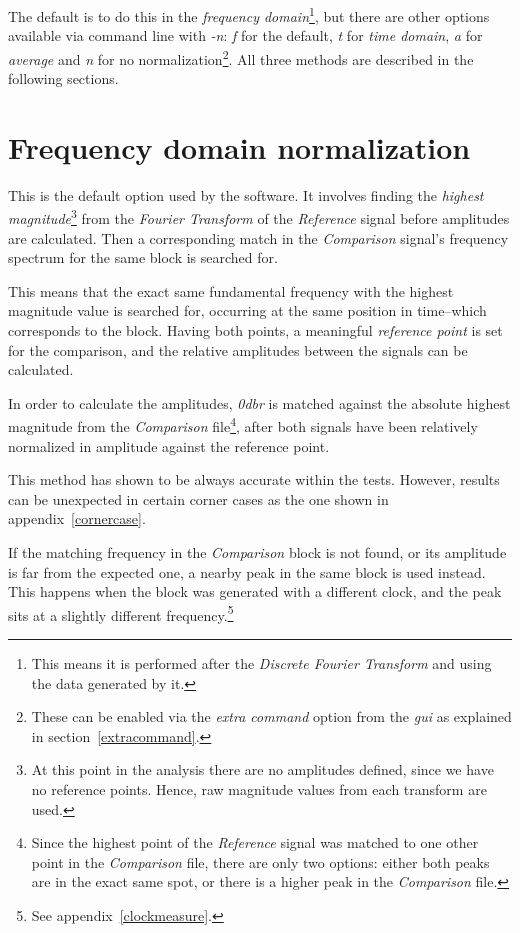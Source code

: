 \documentclass[10pt,a4paper]{report}
\newcommand{\ac}[1]{\textit{\mbox{\acrshort{#1}}}}
\newcommand{\dbr}[1]{\textit{\mbox{#1\acrshort{dbr}}}}
\begin{document}
\begin{appendices}
The default is to do this in the \textit{frequency domain}\footnote{This means it is performed after the \textit{Discrete Fourier Transform} and using the data generated by it.}, but there are other options available via command line with \textit{-n}: \textit{f} for the default, \textit{t} for \textit{time domain}, \textit{a} for \textit{average} and \textit{n} for no normalization\footnote{These can be enabled via the \textit{extra command} option from the \ac{gui} as explained in section~\ref{extracommand}.}. All three methods are described in the following sections.

\section{Frequency domain normalization}

This is the default option used by the software. It involves finding the \textit{highest magnitude}\footnote{At this point in the analysis there are no amplitudes defined, since we have no reference points. Hence, raw magnitude values from each transform are used.} from the \textit{Fourier Transform} of the \textit{Reference} signal before amplitudes are calculated. Then a corresponding match in the \textit{Comparison} signal's frequency spectrum for the same block is searched for. 

This means that the exact same fundamental frequency with the highest magnitude value is searched for, occurring at the same position in time--which corresponds to the block. Having both points, a meaningful \textit{reference point} is set for the comparison, and the relative amplitudes between the signals can be calculated.

In order to calculate the amplitudes, \dbr{0} is matched against the absolute highest magnitude from the \textit{Comparison} file\footnote{Since the highest point of the \textit{Reference} signal was matched to one other point in the \textit{Comparison} file, there are only two options: either both peaks are in the exact same spot, or there is a higher peak in the \textit{Comparison} file.}, after both signals have been relatively normalized in amplitude against the reference point.

This method has shown to be always accurate within the tests. However, results can be unexpected in certain corner cases as the one shown in appendix~\ref{cornercase}.

If the matching frequency in the \textit{Comparison} block is not found, or its amplitude is far from the expected one, a nearby peak in the same block is used instead. This happens when the block was generated with a different clock, and the peak sits at a slightly different frequency.\footnote{See appendix~\ref{clockmeasure}.}


\end{appendices}
\end{document}
